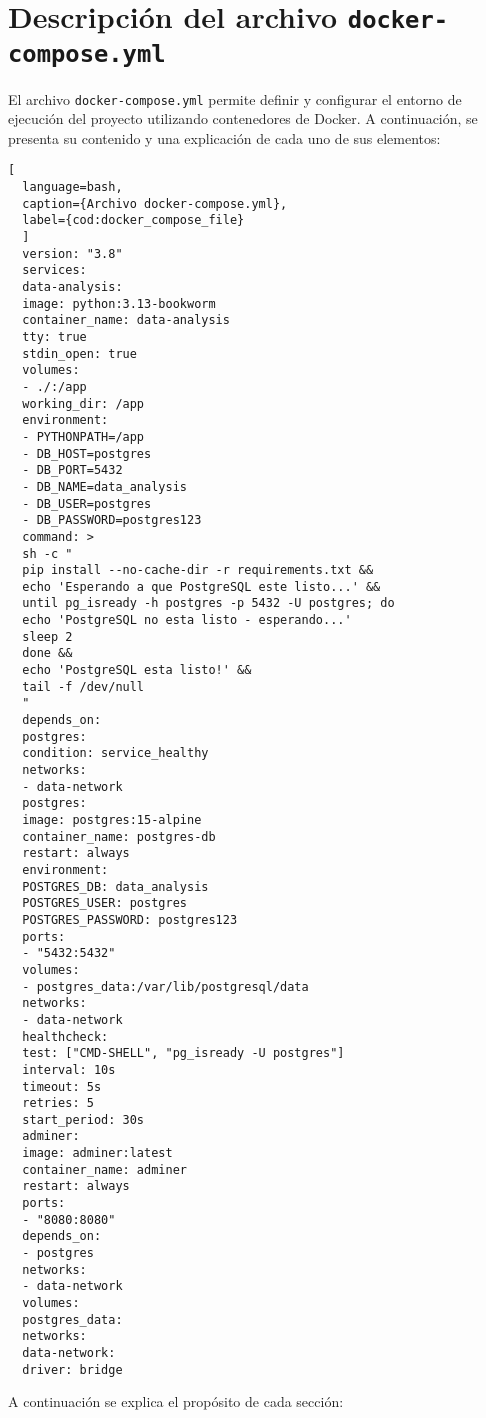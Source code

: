 \section{Descripción del archivo \texttt{docker-compose.yml}}
El archivo \texttt{docker-compose.yml} permite definir y configurar el entorno de ejecución del proyecto utilizando contenedores de Docker. A continuación, se presenta su contenido y una explicación de cada uno de sus elementos:
\vspace{3mm}
\begin{lstlisting}[
  language=bash,
  caption={Archivo docker-compose.yml},
  label={cod:docker_compose_file}
  ]
  version: "3.8"
  services:
  data-analysis:
  image: python:3.13-bookworm
  container_name: data-analysis
  tty: true
  stdin_open: true
  volumes:
  - ./:/app
  working_dir: /app
  environment:
  - PYTHONPATH=/app
  - DB_HOST=postgres
  - DB_PORT=5432
  - DB_NAME=data_analysis
  - DB_USER=postgres
  - DB_PASSWORD=postgres123
  command: >
  sh -c "
  pip install --no-cache-dir -r requirements.txt &&
  echo 'Esperando a que PostgreSQL este listo...' &&
  until pg_isready -h postgres -p 5432 -U postgres; do
  echo 'PostgreSQL no esta listo - esperando...'
  sleep 2
  done &&
  echo 'PostgreSQL esta listo!' &&
  tail -f /dev/null
  "
  depends_on:
  postgres:
  condition: service_healthy
  networks:
  - data-network
  postgres:
  image: postgres:15-alpine
  container_name: postgres-db
  restart: always
  environment:
  POSTGRES_DB: data_analysis
  POSTGRES_USER: postgres
  POSTGRES_PASSWORD: postgres123
  ports:
  - "5432:5432"
  volumes:
  - postgres_data:/var/lib/postgresql/data
  networks:
  - data-network
  healthcheck:
  test: ["CMD-SHELL", "pg_isready -U postgres"]
  interval: 10s
  timeout: 5s
  retries: 5
  start_period: 30s
  adminer:
  image: adminer:latest
  container_name: adminer
  restart: always
  ports:
  - "8080:8080"
  depends_on:
  - postgres
  networks:
  - data-network
  volumes:
  postgres_data:
  networks:
  data-network:
  driver: bridge
\end{lstlisting}
A continuación se explica el propósito de cada sección:

